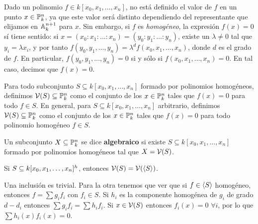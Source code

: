 \documentclass[ACGA.tex]{subfiles}
\begin{document}
Dado un polinomio $f\in k[x_0,x_1,\ldots,x_n]$, no está definido el valor de $f$ en un punto $x\in\mathbb{P}^n_k$, ya que este valor será distinto dependiendo del representante que elijamos en $\mathbb{A}^{n+1}_k$ para $x$. Sin embargo, si $f$ es \emph{homogéneo}, la expresión $f(x)=0$ sí tiene sentido: si $x=(x_0:x_1:\ldots:x_n)=(y_0:y_1:\ldots:y_n)$, existe un $\lambda\neq 0$ tal que $y_i=\lambda x_i$, y por tanto $f(y_0,y_1,\ldots,y_n)=\lambda^df(x_0,x_1,\ldots,x_n)$, donde $d$ es el grado de $f$. En particular, $f(y_0,y_1,\ldots,y_n)=0$ si y sólo si $f(x_0,x_1,\ldots,x_n)=0$. En tal caso, decimos que $f(x)=0$.

Para todo subconjunto $S\subseteq k[x_0,x_1,\ldots,x_n]$ formado por polinomios homogéneos, definimos $\mathcal{V}(S)\subseteq \mathbb{P}^n_k$ como el conjunto de los $x\in\mathbb{P}^n_k$ tales que $f(x)=0$ para todo $f\in S$. En general, para $S\subseteq k[x_0,x_1,\ldots,x_n]$ arbitrario, definimos $\mathcal{V}(S)\subseteq \mathbb{P}^n_k$ como el conjunto de los $x\in\mathbb{P}^n_k$ tales que $f(x)=0$ para todo polinomio homogéneo $f\in S$. 

\begin{defi}
 Un subconjunto $X\subseteq\mathbb{P}^n_k$ se dice {\bf algebraico} si existe $S\subseteq k[x_0,x_1,\ldots,x_n]$ formado por polinomios homogéneos tal que $X=\mathcal{V}(S)$.
\end{defi}

\begin{prop}
Si $S\subseteq k[x_0,x_1,\dotsc,x_{n}]^h$, entonces $\mathcal{V}(S)=\mathcal{V}(\langle{S}\rangle)$. 
\end{prop}
\begin{dem}
Una inclusión es trivial. Para la otra tenemos que ver que si $f\in \langle{S}\rangle$ homogéneo, entonces $f=\sum g_i f_i$ con $f_i \in S$. Si $h_i$ es la componente homogénea de $g_i$ de grado $d-d_i$ entonces $\sum g_i f_i = \sum h_i f_i$. Si $x\in \mathcal{V}(S)$ entonces $f_i(x)=0$ $\forall i$, por lo que $\sum h_i (x) f_i (x) =0$. 
\end{dem}

\end{document}
